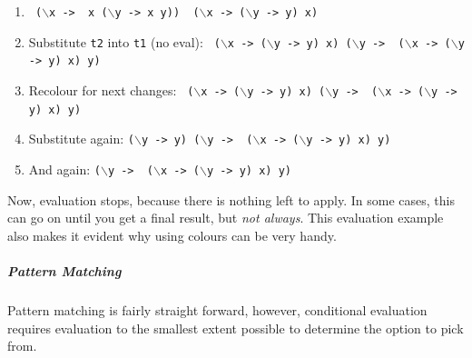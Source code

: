 \begin{enumerate}
    \item \texttt{{\color{red} ($\backslash$x ->} {\color{ForestGreen} x ($\backslash$y -> x y)}{\color{red})} {\color{orange} ($\backslash$x -> ($\backslash$y -> y) x)}}
    \item Substitute \texttt{t2} into \texttt{t1} (no eval):
          \texttt{{\color{orange} ($\backslash$x -> ($\backslash$y -> y) x)} {\color{ForestGreen}($\backslash$y -> {\color{orange} ($\backslash$x -> ($\backslash$y -> y) x)} y)}}
    \item Recolour for next changes:
          \texttt{{\color{orange} ($\backslash$x -> {\color{purple}($\backslash$y -> y)} x)} {\color{ForestGreen}($\backslash$y ->
                      {\color{Aquamarine} ($\backslash$x -> ($\backslash$y -> y) x)} y)}}
    \item Substitute again:
          \texttt{{\color{purple}($\backslash$y -> y)} {\color{ForestGreen}($\backslash$y ->
                      {\color{Aquamarine} ($\backslash$x -> ($\backslash$y -> y) x)} y)}}
    \item And again:
          \texttt{{\color{ForestGreen}($\backslash$y ->
                      {\color{Aquamarine} ($\backslash$x -> ($\backslash$y -> y) x)} y)}}
\end{enumerate}
Now, evaluation stops, because there is nothing left to apply. In some cases, this can go on until you get a final result, but \textit{not always}.
This evaluation example also makes it evident why using colours can be very handy.

\subparagraph{Pattern Matching}
Pattern matching is fairly straight forward, however, conditional evaluation requires evaluation to the smallest extent possible to determine the option to pick from.


